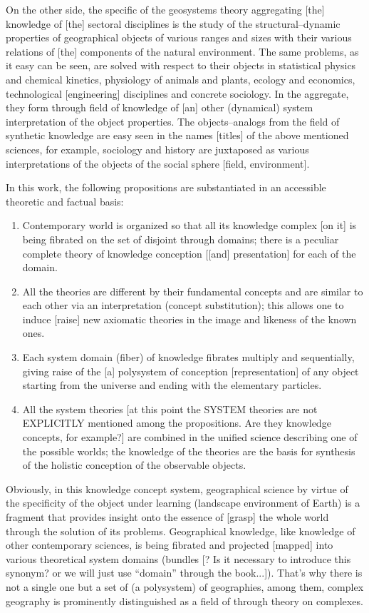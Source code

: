 \documentclass[12pt,leqno]{book}
\numberwithin{equation}{chapter}
\begin{document}
On the other side, the specific of the geosystems theory aggregating [the] knowledge of [the] sectoral disciplines is the study of the structural--dynamic properties of geographical objects of various ranges and sizes with their various relations of [the] components of the natural environment. The same problems, as it easy can be seen, are solved with respect to their objects in statistical physics and chemical kinetics, physiology of animals and plants, ecology and economics, technological [engineering] disciplines and concrete sociology. In the aggregate, they form through field of knowledge of [an] other (dynamical) system interpretation of the object properties. The objects--analogs from the field of synthetic knowledge are easy seen in the names [titles] of the above mentioned sciences, for example, sociology and history are juxtaposed as various interpretations of the objects of the social sphere [field, environment].

In this work, the following propositions are substantiated in an accessible theoretic and factual basis:
\begin{enumerate}\bf
\item{} Contemporary world is organized so that all its knowledge complex [on it] is being fibrated on the set of disjoint through domains; there is a peculiar complete theory of knowledge conception [[and] presentation] for each of the domain.
\item{} All the theories are different by their fundamental concepts and are similar to each other via an interpretation (concept substitution); this allows one to induce [raise] new axiomatic theories in the image and likeness of the known ones.
\item{} Each system domain (fiber) of knowledge fibrates multiply and sequentially, giving raise of the [a] polysystem of conception [representation] of any object starting from the universe and ending with the elementary particles.
\item{} All the system theories [at this point the SYSTEM theories are not EXPLICITLY mentioned among the propositions. Are they knowledge concepts, for example?] are combined in the unified science describing one of the possible worlds; the knowledge of the theories are the basis for synthesis of the holistic conception of the observable objects.
\end{enumerate}

Obviously, in this knowledge concept system, geographical science by virtue of the specificity of the object under learning (landscape environment of Earth) is a fragment that provides insight onto the essence of [grasp] the whole world through the solution of its problems. Geographical knowledge, like knowledge of other contemporary sciences, is being fibrated and projected [mapped] into various theoretical system domains (bundles [? Is it necessary to introduce this synonym? or we will just use ``domain'' through the book...]). That's why there is not a single one but a set of (a polysystem) of geographies, among them, complex geography is prominently distinguished as a field of through theory on complexes.
\end{document}

